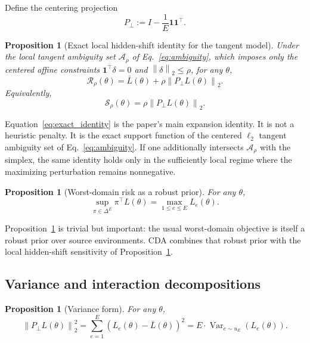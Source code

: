 \documentclass{article}
\newtheorem{proposition}[theorem]{Proposition}
\theoremstyle{definition}
\newcommand{\cA}{\mathcal{A}}
\newcommand{\Var}{\operatorname{Var}}
\newcommand{\cda}{\textup{\textsc{CDA}}}
\newcommand{\one}{\mathbf{1}}
\newcommand{\simplex}{\Delta}
\newcommand{\norm}[1]{\left\lVert #1 \right\rVert}
\newcommand{\paren}[1]{\left( #1 \right)}
\newcommand{\ub}{u_E}
\begin{document}
Define the centering projection
\[
P_\perp := I - \frac{1}{E}\one\one^\top.
\]

\begin{proposition}[Exact local hidden-shift identity for the tangent model]
\label{prop:exact_identity}
Under the local tangent ambiguity set \(\cA_\rho\) of Eq.~\eqref{eq:ambiguity}, which imposes only the centered affine constraints \(\one^\top \delta = 0\) and \(\norm{\delta}_2 \le \rho\), for any \(\theta\),
\begin{equation}
\mathcal R_\rho(\theta)
=
\bar L(\theta) + \rho \norm{P_\perp L(\theta)}_2.
\label{eq:exact_identity}
\end{equation}
Equivalently,
\begin{equation}
\mathcal S_\rho(\theta)=\rho \norm{P_\perp L(\theta)}_2.
\label{eq:exact_sensitivity}
\end{equation}
\end{proposition}

Equation~\eqref{eq:exact_identity} is the paper's main expansion identity. It is not a heuristic penalty. It is the exact support function of the centered \(\ell_2\) tangent ambiguity set of Eq.~\eqref{eq:ambiguity}. If one additionally intersects \(\cA_\rho\) with the simplex, the same identity holds only in the sufficiently local regime where the maximizing perturbation remains nonnegative.

\begin{proposition}[Worst-domain risk as a robust prior]
\label{prop:worst_domain_prior}
For any \(\theta\),
\begin{equation}
\sup_{\pi \in \simplex^E} \pi^\top L(\theta)
=
\max_{1\le e\le E} L_e(\theta).
\label{eq:worst_domain_identity}
\end{equation}
\end{proposition}

Proposition~\ref{prop:worst_domain_prior} is trivial but important: the usual worst-domain objective is itself a robust prior over source environments. \cda{} combines that robust prior with the local hidden-shift sensitivity of Proposition~\ref{prop:exact_identity}.

\subsection{Variance and interaction decompositions}

\begin{proposition}[Variance form]
\label{prop:variance_form}
For any \(\theta\),
\begin{equation}
\norm{P_\perp L(\theta)}_2^2
=
\sum_{e=1}^{E}\paren{L_e(\theta)-\bar L(\theta)}^2
=
E \cdot \Var_{e\sim \ub}\!\paren{L_e(\theta)}.
\label{eq:variance_form}
\end{equation}
\end{proposition}
\end{document}

